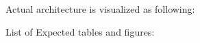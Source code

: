 \documentclass{article}
\begin{document}
Actual architecture is visualized as following:
\begin{figure}[h]
\end{figure}
\newpage
List of Expected tables and figures:
\end{document}
